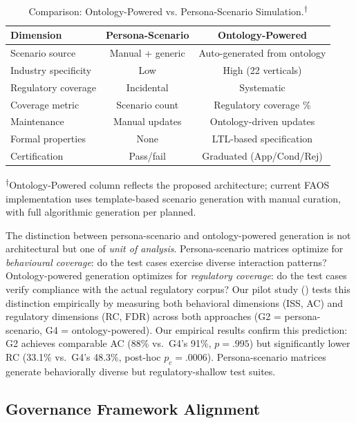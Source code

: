 \documentclass[11pt,a4paper]{article}
\newcommand{\faos}{\textsc{FAOS}}
\begin{document}
\begin{table}[htbp]
\centering
\caption{Comparison: Ontology-Powered vs. Persona-Scenario
  Simulation.\textsuperscript{$\dagger$}}
\label{tab:comparison}
\begin{tabular}{@{}lcc@{}}
\toprule
\textbf{Dimension} & \textbf{Persona-Scenario} & \textbf{Ontology-Powered} \\
\midrule
Scenario source & Manual + generic & Auto-generated from ontology \\
Industry specificity & Low & High (22 verticals) \\
Regulatory coverage & Incidental & Systematic \\
Coverage metric & Scenario count & Regulatory coverage \% \\
Maintenance & Manual updates & Ontology-driven updates \\
Formal properties & None & LTL-based specification \\
Certification & Pass/fail & Graduated (App/Cond/Rej) \\
\bottomrule
\end{tabular}

\smallskip
\noindent\textsuperscript{$\dagger$}\footnotesize{Ontology-Powered
column reflects the proposed architecture; current \faos{}
implementation uses template-based scenario generation with manual
curation, with full algorithmic generation per
 planned.}
\end{table}

\noindent The distinction between persona-scenario and ontology-powered
generation is not architectural but one of \emph{unit of analysis}.
Persona-scenario matrices optimize for \emph{behavioural coverage}:
do the test cases exercise diverse interaction patterns?
Ontology-powered generation optimizes for \emph{regulatory coverage}:
do the test cases verify compliance with the actual regulatory
corpus? Our pilot study ()
tests this distinction empirically by measuring both behavioral
dimensions (ISS, AC) and regulatory dimensions (RC, FDR) across
both approaches (G2 = persona-scenario, G4 = ontology-powered).
Our empirical results confirm this prediction: G2 achieves comparable
AC (88\% vs.\ G4's 91\%, $p{=}.995$) but significantly lower RC
(33.1\% vs.\ G4's 48.3\%, post-hoc $p_c{=}.0006$). Persona-scenario
matrices generate behaviorally diverse but regulatory-shallow test
suites.

\subsection{Governance Framework Alignment}
\end{document}
